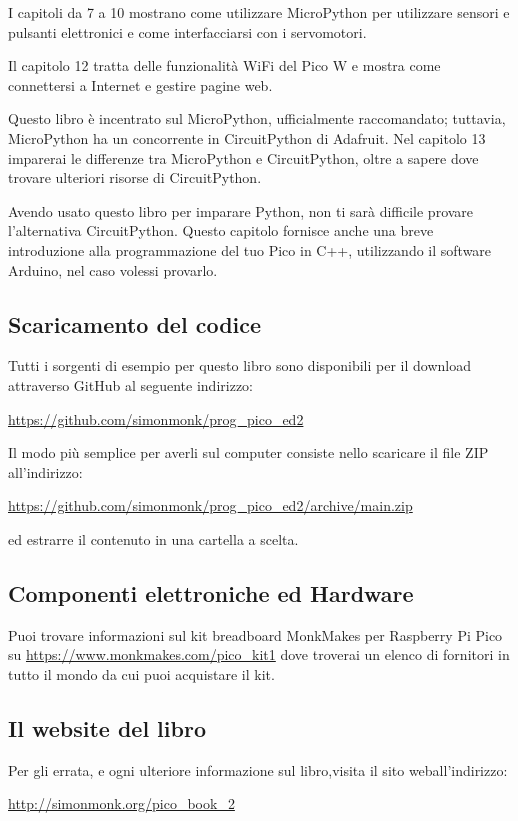 I capitoli da 7 a 10 mostrano come utilizzare MicroPython per utilizzare sensori e pulsanti elettronici e come interfacciarsi con i servomotori.

Il capitolo 12 tratta delle funzionalità WiFi del Pico W e mostra come connettersi a Internet e gestire pagine web.

Questo libro è incentrato sul MicroPython, ufficialmente raccomandato; tuttavia, MicroPython ha un concorrente in CircuitPython di Adafruit. Nel capitolo 13 imparerai le differenze tra MicroPython e CircuitPython, oltre a sapere dove trovare ulteriori risorse di CircuitPython.

Avendo usato questo libro per imparare Python, non ti sarà difficile provare l'alternativa CircuitPython. Questo capitolo fornisce anche una breve introduzione alla programmazione del tuo Pico in C++, utilizzando il software Arduino, nel caso volessi provarlo.

\subsection*{Scaricamento del codice}
Tutti i sorgenti di esempio per questo libro sono disponibili per il download attraverso GitHub al seguente indirizzo:

\url{https://github.com/simonmonk/prog_pico_ed2}

Il modo più semplice per averli sul computer consiste nello scaricare il file ZIP all'indirizzo:

\url{https://github.com/simonmonk/prog_pico_ed2/archive/main.zip}

ed estrarre il contenuto in una cartella a scelta.

\subsection*{Componenti elettroniche ed Hardware}
Puoi trovare informazioni sul kit breadboard MonkMakes per Raspberry Pi
Pico su \url{https://www.monkmakes.com/pico_kit1} dove troverai un elenco di fornitori in tutto il mondo da cui puoi acquistare il kit.

\subsection*{Il website del libro}
Per gli errata, e ogni ulteriore informazione sul libro,visita il sito weball'indirizzo: 

\url{http://simonmonk.org/pico_book_2}


